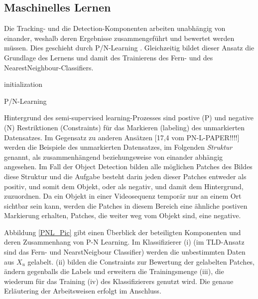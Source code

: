 	\subsection{Maschinelles Lernen}
	Die Tracking- und die Detection-Komponenten arbeiten unabhängig von
	einander, weshalb deren Ergebnisse zusammengeführt und bewertet werden
	müssen. Dies geschieht durch P/N-Learning \cite{PNL}. Gleichzeitig
	bildet dieser Ansatz die Grundlage des Lernens und damit des Trainierens
	des Fern- und des NearestNeighbour-Classifiers. 

	\begin{algorithm}
	\vspace{0.2cm}
	initialization\;
	\caption{P/N-Learning}
	\label{alg:learning}
	\vspace{0.2cm}
	\end{algorithm}

	Hintergrund des semi-supervised learning-Prozesses sind postive (P)
	und negative (N) Restriktionen (Constraints) für das Markieren (labeling)
	des unmarkierten Datensatzes. Im Gegensatz zu anderen Ansätzen {[}17,4
	vom PN-L-PAPER!!!!{]} werden die Beispiele des unmarkierten Datensatzes,
	im Folgenden \textit{Struktur} genannt, als zusammenhängend beziehungsweise
	von einander abhängig angesehen. Im Fall der Object Detection bilden
	alle möglichen Patches des Bildes diese Struktur und die Aufgabe besteht
	darin jeden dieser Patches entweder als positiv, und somit dem Objekt,
	oder als negativ, und damit dem Hintergrund, zuzuordnen. Da ein Objekt
	in einer Videosequenz temporär nur an einem Ort sichtbar sein kann,
	werden die Patches in diesem Bereich eine ähnliche postiven Markierung
	erhalten, Patches, die weiter weg vom Objekt sind, eine negative.

	Abbildung \ref{PNL_Pic} gibt einen Überblick der beteiligten Komponenten
	und deren Zusammenhang von P-N Learning. Im Klassifizierer (i) (im
	TLD-Ansatz sind das Fern- und NearstNeigbour Classifier) werden die
	unbestimmten Daten aus $X_{u}$ gelabelt. (ii) bilden die Constraints
	zur Bewertung der gelabelten Patches, ändern gegenballs die Labels
	und erweitern die Trainingsmenge (iii), die wiederum für das Training
	(iv) des Klassifizierers genutzt wird. Die genaue Erläutering der Arbeitsweisen erfolgt im Anschluss.

